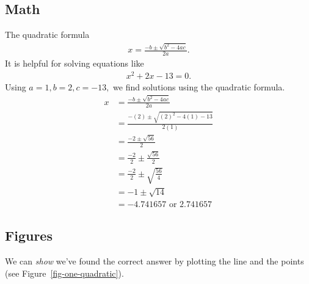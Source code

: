 \documentclass[
]{article}
\begin{document}
\subsection{Math}\label{math}

The quadratic formula \begin{align*}
x = \frac{-b \pm \sqrt{b^2-4ac}}{2a}.
\end{align*} It is helpful for solving equations like \begin{align*}
x^2+2x-13=0.
\end{align*} Using \(a=1,b=2,c=-13,\) we find solutions using the
quadratic formula. \begin{align*}
x &= \frac{-b \pm \sqrt{b^2-4ac}}{2a} \tag{Definition} \\
&= \frac{-(2) \pm \sqrt{(2)^2-4(1)-13}}{2(1)} \tag{Definition} \\
&= \frac{-2 \pm \sqrt{56}}{2} \tag{Symplifying} \\
&= \frac{-2}{2} \pm \frac{\sqrt{56}}{2} \tag{Rewriting} \\
&= \frac{-2}{2} \pm \sqrt{\frac{56}{4} \tag{Rewriting} }\\
&= -1 \pm \sqrt{14} \tag{Symplifying} \\
&= -4.741657 \text{ or } 2.741657
\end{align*}

\subsection{Figures}\label{figures}

We can \emph{show} we've found the correct answer by plotting the line
and the points (see Figure~\ref{fig-one-quadratic}).

\scriptsize
\end{document}
